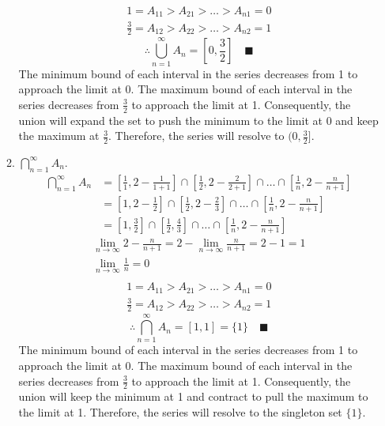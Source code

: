 \documentclass[letterpaper, 12pt]{article}
\newcommand{\qed}{\quad \blacksquare}
\newcommand{\0}{\emptyset}
\begin{document}
\begin{enumerate}
\begin{enumerate}
\begin{align*}
\end{align*}
\begin{align*}
    1 = A_{11} > A_{21} > \dots > A_{n1} = 0 \\
    \frac{3}{2} = A_{12} > A_{22} > \dots > A_{n2} = 1
\end{align*}
\[\therefore \bigcup_{n=1}^{\infty} A_n = \left[0, \frac{3}{2}\right] \qed\]
The minimum bound of each interval in the series decreases from 1 to approach the limit at 0. 
The maximum bound of each interval in the series decreases from $\frac{3}{2}$ to approach the 
limit at 1. Consequently, the union will expand the set to push the minimum to the limit at 0 
and keep the maximum at $\frac{3}{2}$. Therefore, the series will resolve to $(0, \frac{3}{2}]$.
\item $\displaystyle\bigcap_{n=1}^{\infty} A_n$.
\begin{align*}
    \bigcap_{n=1}^{\infty} A_n &= \left[\frac{1}{1}, 2 - \frac{1}{1+1}\right] 
    \cap \left[\frac{1}{2}, 2 - \frac{2}{2+1}\right] 
    \cap \dots 
    \cap \left[\frac{1}{n}, 2 - \frac{n}{n+1}\right] \\
    &= \left[1, 2 - \frac{1}{2}\right] 
    \cap \left[\frac{1}{2}, 2 - \frac{2}{3}\right] 
    \cap \dots 
    \cap \left[\frac{1}{n}, 2 - \frac{n}{n+1}\right] \\
    &= \left[1, \frac{3}{2}\right] 
    \cap \left[\frac{1}{2}, \frac{4}{3}\right] 
    \cap \dots 
    \cap \left[\frac{1}{n}, 2 - \frac{n}{n+1}\right]
\end{align*}
\begin{align*}
    \lim_{n \to \infty} 2 - \frac{n}{n+1} = 2 - \lim_{n \to \infty} \frac{n}{n+1} = 2 - 1 = 1 \\
    \lim_{n \to \infty} \frac{1}{n} = 0 \\
\end{align*}
\begin{align*}
    1 = A_{11} > A_{21} > \dots > A_{n1} = 0 \\
    \frac{3}{2} = A_{12} > A_{22} > \dots > A_{n2} = 1
\end{align*}
\[\therefore \bigcap_{n=1}^{\infty} A_n = [1, 1] = \{1\} \qed\]
The minimum bound of each interval in the series decreases from 1 to approach the limit at 0. 
The maximum bound of each interval in the series decreases from $\frac{3}{2}$ to approach the 
limit at 1. Consequently, the union will keep the minimum at 1 and contract to pull the maximum 
to the limit at 1. Therefore, the series will resolve to the singleton set $\{1\}$.
\end{enumerate}
\end{enumerate}
\end{document}

